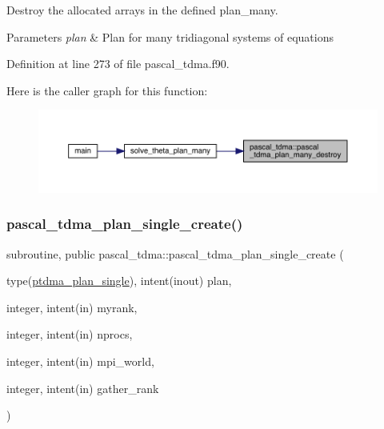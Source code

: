 Destroy the allocated arrays in the defined plan\+\_\+many. 


\begin{DoxyParams}{Parameters}
{\em plan} & Plan for many tridiagonal systems of equations \\
\hline
\end{DoxyParams}


Definition at line 273 of file pascal\+\_\+tdma.\+f90.

Here is the caller graph for this function\+:
\nopagebreak
\begin{figure}[H]
\begin{center}
\leavevmode
\includegraphics[width=350pt]{namespacepascal__tdma_a8438e6774617871b147af9ec8bdad6ce_icgraph}
\end{center}
\end{figure}
\mbox{\label{namespacepascal__tdma_a5dfc2d7c919b47ad364a74d141532a9f}} 
\subsubsection{\texorpdfstring{pascal\_tdma\_plan\_single\_create()}{pascal\_tdma\_plan\_single\_create()}}
{\footnotesize\ttfamily subroutine, public pascal\+\_\+tdma\+::pascal\+\_\+tdma\+\_\+plan\+\_\+single\+\_\+create (\begin{DoxyParamCaption}\item[{type(\mbox{\hyperlink{structpascal__tdma_1_1ptdma__plan__single}{ptdma\+\_\+plan\+\_\+single}}), intent(inout)}]{plan,  }\item[{integer, intent(in)}]{myrank,  }\item[{integer, intent(in)}]{nprocs,  }\item[{integer, intent(in)}]{mpi\+\_\+world,  }\item[{integer, intent(in)}]{gather\+\_\+rank }\end{DoxyParamCaption})}



